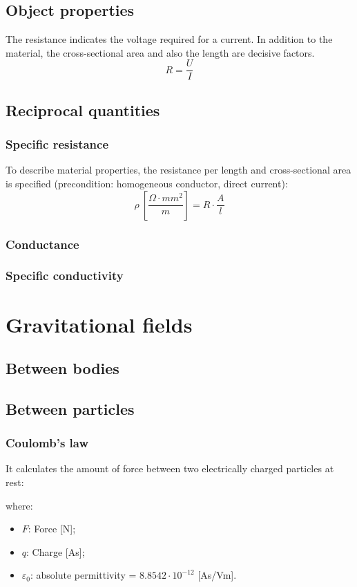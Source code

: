 \documentclass{article}
\begin{document}
\subsection{Object properties}
The resistance indicates the voltage required for a
current. In addition to the material, the cross-sectional
area and also the length are decisive factors.
\[R=\frac{U}{I}\]

\subsection{Reciprocal quantities}
\subsubsection{Specific resistance}
To describe material properties, the resistance per length
and cross-sectional area is specified (precondition:
homogeneous conductor, direct current):
\[\rho\ [\frac{\Omega \cdot mm^2}{m}] = R\cdot \frac{A}{l}\]

\subsubsection{Conductance}


\subsubsection{Specific conductivity}

\newpage
\section{Gravitational fields}
\subsection{Between bodies}

\subsection{Between particles}
\subsubsection{Coulomb's law}
It calculates the amount of force between two electrically charged
particles at rest:

where:
\begin{itemize}
    \item $F$: Force [N];
    \item $q$: Charge [As];
    \item $\varepsilon_0$: absolute permittivity = $8.8542\cdot 10^{-12}$ [As/Vm].
\end{itemize}
\end{document}
